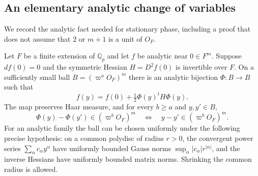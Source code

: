 \subsection{An elementary analytic change of variables}

We record the analytic fact needed for stationary phase, including a
proof that does not assume that $2$ or $m+1$ is a unit of $O_F$.

\begin{lemma}\label{th-morse}
Let $F$ be a finite extension of $\mathbb Q_p$ and let $f$ be analytic
near $0\in F^m$.  Suppose $df(0)=0$ and the symmetric Hessian
$H=D^2f(0)$ is invertible over $F$.  On a sufficiently small ball
$B=(\varpi^aO_F)^m$ there is an analytic bijection
$\Phi:B\to B$ such that
\[
 f(y)=f(0)+\tfrac12\Phi(y)^tH\Phi(y).
\]
The map preserves Haar measure, and for every $b\ge a$ and $y,y'\in B$,
\[
 \Phi(y)-\Phi(y')\in(\varpi^bO_F)^m
 \quad\Longleftrightarrow\quad y-y'\in(\varpi^bO_F)^m.
\]
For an analytic family the ball can be chosen uniformly under the
following precise hypothesis: on a common polydisc of radius $r>0$,
the convergent power series $\sum_\alpha c_\alpha y^\alpha$ have
uniformly bounded Gauss norms
$\sup_\alpha |c_\alpha|r^{|\alpha|}$, and the inverse Hessians have
uniformly bounded matrix norms.  Shrinking the common radius is allowed.
\end{lemma}

